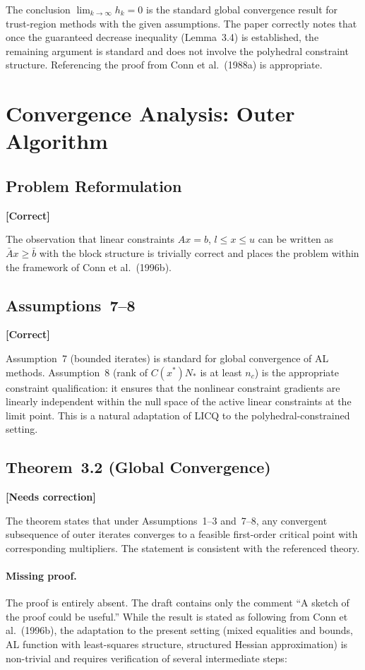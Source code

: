 \documentclass[11pt]{article}
\newcommand{\statusok}{\textcolor{okcolor}{\textbf{[Correct]}}}
\newcommand{\statuserr}{\textcolor{issuecolor}{\textbf{[Needs correction]}}}
\theoremstyle{plain}
\begin{document}
The conclusion $\lim_{k\to\infty} h_k = 0$ is the standard global convergence result for trust-region methods with the given assumptions. The paper correctly notes that once the guaranteed decrease inequality (Lemma~3.4) is established, the remaining argument is standard and does not involve the polyhedral constraint structure. Referencing the proof from Conn et al.\ (1988a) is appropriate.

\section{Convergence Analysis: Outer Algorithm}

\subsection{Problem Reformulation}
\statusok

The observation that linear constraints $Ax = b$, $l \le x \le u$ can be written as $\bar{A}x \ge \bar{b}$ with the block structure is trivially correct and places the problem within the framework of Conn et al.\ (1996b).

\subsection{Assumptions~7--8}
\statusok

Assumption~7 (bounded iterates) is standard for global convergence of AL methods. Assumption~8 (rank of $C(x^*)N_*$ is at least $n_c$) is the appropriate constraint qualification: it ensures that the nonlinear constraint gradients are linearly independent within the null space of the active linear constraints at the limit point. This is a natural adaptation of LICQ to the polyhedral-constrained setting.

\subsection{Theorem~3.2 (Global Convergence)}
\statuserr

The theorem states that under Assumptions~1--3 and~7--8, any convergent subsequence of outer iterates converges to a feasible first-order critical point with corresponding multipliers. The statement is consistent with the referenced theory.

\paragraph{Missing proof.} The proof is entirely absent. The draft contains only the comment ``A sketch of the proof could be useful.'' While the result is stated as following from Conn et al.\ (1996b), the adaptation to the present setting (mixed equalities and bounds, AL function with least-squares structure, structured Hessian approximation) is non-trivial and requires verification of several intermediate steps:
\end{document}
